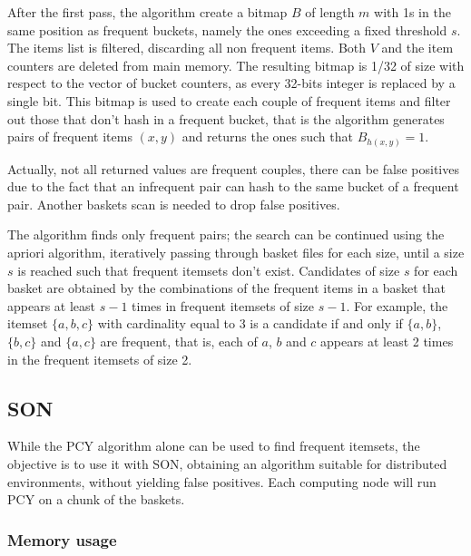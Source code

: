 \documentclass{article}
\begin{document}
After the first pass, the algorithm create a bitmap $B$ of length $m$ with 1s in the same position as frequent buckets, namely the ones exceeding a fixed threshold $s$. The items list is filtered, discarding all non frequent items. Both $V$ and the item counters are deleted from main memory.
The resulting bitmap is 1/32 of size with respect to the vector of bucket counters, as every 32-bits integer is replaced by a single bit. This bitmap is used to create each couple of frequent items and filter out those that don't hash in a frequent bucket, that is the algorithm generates pairs of frequent items $(x, y)$ and returns the ones such that $B_{h(x, y)} = 1$.

Actually, not all returned values are frequent couples, there can be false positives due to the fact that an infrequent pair can hash to the same bucket of a frequent pair. Another baskets scan is needed to drop false positives.

The algorithm finds only frequent pairs; the search can be continued using the apriori algorithm, iteratively passing through basket files for each size, until a size $s$ is reached such that frequent itemsets don't exist.
Candidates of size $s$ for each basket are obtained by the combinations of the frequent items in a basket that appears at least $s-1$ times in frequent itemsets of size $s-1$. For example, the itemset $\{a,b,c\}$ with cardinality  equal to 3 is a candidate if and only if $\{a,b\}$, $\{b,c\}$ and $\{a,c\}$ are frequent, that is, each of $a$, $b$ and $c$ appears at least 2 times in the frequent itemsets of size 2.

\subsection{SON}

While the PCY algorithm alone can be used to find frequent itemsets, the objective is to use it with SON, obtaining an algorithm suitable for distributed environments, without yielding false positives. Each computing node will run PCY on a chunk of the baskets.

\subsubsection{Memory usage}
\end{document}
